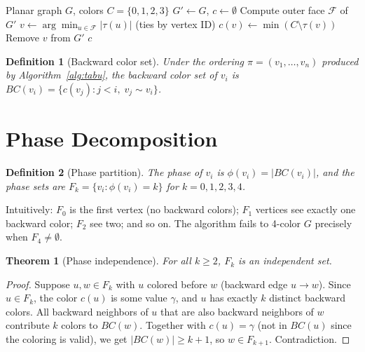 \documentclass[11pt,twocolumn]{article}
\newtheorem{theorem}{Theorem}[section]
\newtheorem{definition}{Definition}[section]
\begin{document}
\begin{algorithm}[t]
\caption{Outer-Face Tab\"{u} Coloring}
\label{alg:tabu}
\begin{algorithmic}[1]
\Require Planar graph $G$, colors $C=\{0,1,2,3\}$
\State $G'\gets G$, $c\gets\emptyset$
  \State Compute outer face $\mathcal{F}$ of $G'$
  \State $v\gets\arg\min_{u\in\mathcal{F}}|\tau(u)|$ \quad (ties by vertex ID)
  \State $c(v)\gets\min(C\setminus\tau(v))$
  \State Remove $v$ from $G'$
\EndWhile
\State\Return $c$
\end{algorithmic}
\end{algorithm}

\begin{definition}[Backward color set]
Under the ordering $\pi=(v_1,\dots,v_n)$ produced by Algorithm~\ref{alg:tabu},
the \emph{backward color set} of $v_i$ is
$BC(v_i)=\{c(v_j):j<i,\;v_j\sim v_i\}$.
\end{definition}

\section{Phase Decomposition}
\label{sec:phases}

\begin{definition}[Phase partition]
The \emph{phase} of $v_i$ is $\phi(v_i)=|BC(v_i)|$, and the \emph{phase sets}
are $F_k=\{v_i:\phi(v_i)=k\}$ for $k=0,1,2,3,4$.
\end{definition}

Intuitively: $F_0$ is the first vertex (no backward colors); $F_1$ vertices see
exactly one backward color; $F_2$ see two; and so on. The algorithm fails to
4-color $G$ precisely when $F_4\ne\emptyset$.

\begin{theorem}[Phase independence]
\label{thm:phases}
For all $k\geq 2$, $F_k$ is an independent set.
\end{theorem}

\begin{proof}
Suppose $u,w\in F_k$ with $u$ colored before $w$ (backward edge $u\to w$).
Since $u\in F_k$, the color $c(u)$ is some value $\gamma$, and $u$ has exactly
$k$ distinct backward colors. All backward neighbors of $u$ that are also
backward neighbors of $w$ contribute $k$ colors to $BC(w)$. Together with
$c(u)=\gamma$ (not in $BC(u)$ since the coloring is valid), we get
$|BC(w)|\geq k+1$, so $w\in F_{k+1}$. Contradiction.
\end{proof}
\end{document}
